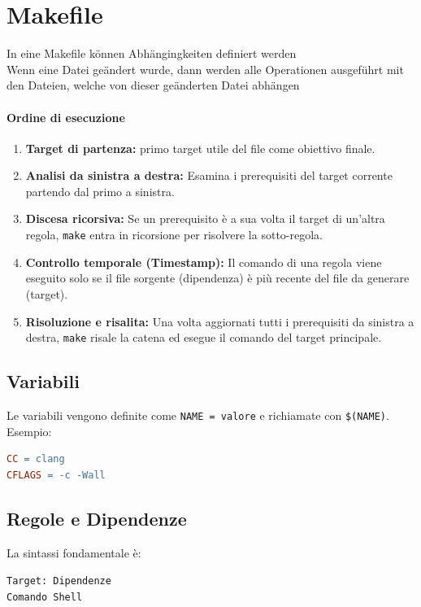 \section{Makefile}

In eine Makefile können Abhängingkeiten definiert werden\\
Wenn eine Datei geändert wurde, dann werden alle Operationen ausgeführt mit den Dateien, welche von
dieser geänderten Datei abhängen\smallbreak

\paragraph{Ordine di esecuzione}
\begin{enumerate}
    \item \textbf{Target di partenza:} primo target utile del file come obiettivo finale.
    \item \textbf{Analisi da sinistra a destra:} Esamina i prerequisiti del target corrente partendo dal primo a sinistra.
    \item \textbf{Discesa ricorsiva:} Se un prerequisito è a sua volta il target di un'altra regola, \texttt{make} entra in ricorsione per risolvere la sotto-regola.
    \item \textbf{Controllo temporale (Timestamp):} Il comando di una regola viene eseguito solo se il file sorgente (dipendenza) è più recente del file da generare (target).
    \item \textbf{Risoluzione e risalita:} Una volta aggiornati tutti i prerequisiti da sinistra a destra, \texttt{make} risale la catena ed esegue il comando del target principale.
\end{enumerate}

\subsection{Variabili}
Le variabili vengono definite come \texttt{NAME = valore} e richiamate con \texttt{\$(NAME)}. 
Esempio:
\begin{lstlisting}[language=make]
CC = clang
CFLAGS = -c -Wall
\end{lstlisting}

\subsection{Regole e Dipendenze}
La sintassi fondamentale è:
\begin{center}
\texttt{Target: Dipendenze} \\
\texttt{\quad [TAB] Comando Shell}
\end{center}

